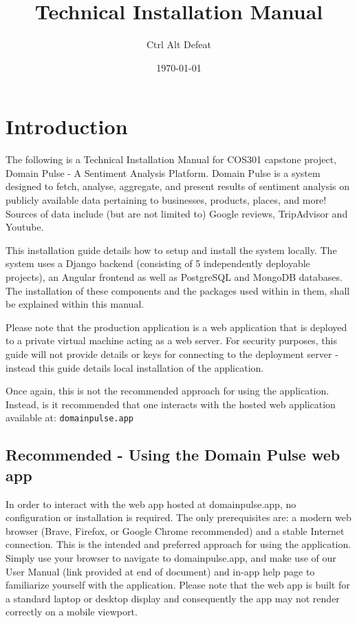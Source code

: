 \documentclass[12pt]{article}
\title{Technical Installation Manual}
\author{Ctrl Alt Defeat}
\date{\today}
\begin{document}
\maketitle

\tableofcontents


\section{Introduction}
The following is a Technical Installation Manual for COS301 capstone project, Domain Pulse - A Sentiment Analysis Platform. Domain Pulse is
a system designed to fetch, analyse, aggregate, and present results of sentiment analysis on publicly available data pertaining to
businesses, products, places, and more! Sources of data include (but are not limited to) Google reviews, TripAdvisor and Youtube.

This installation guide details how to setup and install the system locally. The system uses a Django backend (consisting of 5 independently deployable projects),
an Angular frontend as well as PostgreSQL and MongoDB databases. The installation of these components and the packages used within in
them, shall be explained within this manual.

Please note that the production application is a web application that is deployed to a private virtual machine acting as a web server. For
security purposes, this guide will not provide details or keys for connecting to the deployment server - instead this guide details local installation
of the application.

Once again, this is not the recommended approach for using the application. Instead, is it recommended that one interacts with the hosted web
application available at: \texttt{domainpulse.app}

\subsection{Recommended - Using the Domain Pulse web app}
In order to interact with the web app hosted at domainpulse.app, no configuration or installation is required. The only
prerequisites are: a modern web browser (Brave, Firefox, or Google Chrome recommended) and a stable Internet connection. This is the
intended and preferred approach for using the application. Simply use your browser to navigate to domainpulse.app, and make use of
our User Manual (link provided at end of document) and in-app help page to familiarize yourself with the application. Please note that
the web app is built for a standard laptop or desktop display and consequently the app may not render correctly on a mobile viewport.
\end{document}
